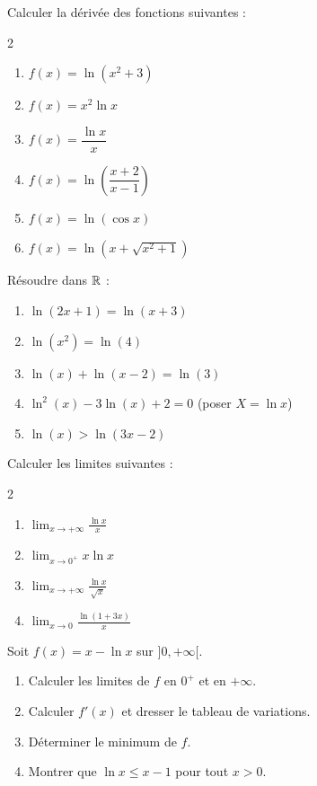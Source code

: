 \begin{exercice}[3 : D\'{e}riv\'{e}es]
  Calculer la d\'{e}riv\'{e}e des fonctions suivantes :
  \begin{multicols}{2}
  \begin{enumerate}
    \item $f(x) = \ln(x^2 + 3)$
    \item $f(x) = x^2 \ln x$
    \item $f(x) = \dfrac{\ln x}{x}$
    \item $f(x) = \ln\!\left(\dfrac{x+2}{x-1}\right)$
    \item $f(x) = \ln(\cos x)$
    \item $f(x) = \ln(x + \sqrt{x^2+1})$
  \end{enumerate}
  \end{multicols}
\end{exercice}

\begin{exercice}
  R\'{e}soudre dans $\mathbb{R}$ :
  \begin{enumerate}
    \item $\ln(2x+1) = \ln(x+3)$
    \item $\ln(x^2) = \ln(4)$
    \item $\ln(x) + \ln(x-2) = \ln(3)$
    \item $\ln^2(x) - 3\ln(x) + 2 = 0$
          \quad (poser $X = \ln x$)
    \item $\ln(x) > \ln(3x - 2)$
  \end{enumerate}
\end{exercice}

\begin{exercice}[5 : Limites]
  Calculer les limites suivantes :
  \begin{multicols}{2}
  \begin{enumerate}
    \item $\displaystyle\lim_{x\to+\infty} \frac{\ln x}{x}$
    \item $\displaystyle\lim_{x\to 0^+} x \ln x$
    \item $\displaystyle\lim_{x\to+\infty} \frac{\ln x}{\sqrt{x}}$
    \item $\displaystyle\lim_{x\to 0} \frac{\ln(1+3x)}{x}$
  \end{enumerate}
  \end{multicols}
\end{exercice}

\begin{exercice}
  Soit $f(x) = x - \ln x$ sur $]0,+\infty[$.
  \begin{enumerate}
    \item Calculer les limites de $f$ en $0^+$ et en $+\infty$.
    \item Calculer $f'(x)$ et dresser le tableau de variations.
    \item D\'{e}terminer le minimum de $f$.
    \item Montrer que $\ln x \leq x - 1$ pour tout $x > 0$.
  \end{enumerate}
\end{exercice}